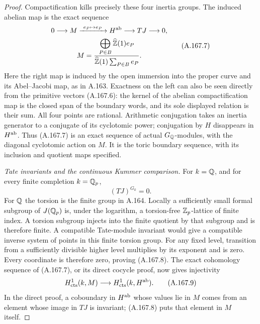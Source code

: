 \begin{proof}
Compactification kills precisely these four inertia groups.  The
induced abelian map is the exact sequence
\[
 \begin{gathered}
 0\longrightarrow M
   \xrightarrow{\ e_P\mapsto e_P\ }H^{\rm ab}
   \longrightarrow TJ\longrightarrow0,\\
 M=\frac{\displaystyle\bigoplus_{P\in B}\widehat{\mathbb Z}(1)e_P}
                 {\widehat{\mathbb Z}(1)\sum_{P\in B}e_P}.
 \end{gathered}
\tag{A.167.7}
\]
Here the right map is induced by the open immersion into the proper
curve and its Abel--Jacobi map, as in A.163.  Exactness on the left
can also be seen directly from the primitive vectors (A.167.6): the
kernel of the abelian compactification map is the closed span of the
boundary words, and its sole displayed relation is their sum.
All four points are rational.  Arithmetic conjugation takes an inertia
generator to a conjugate of its cyclotomic power; conjugation by
\(H\) disappears in \(H^{\rm ab}\).  Thus (A.167.7) is an exact
sequence of actual \(G_\mathbb Q\)-modules, with the diagonal cyclotomic
action on \(M\).  It is the toric boundary sequence, with its
inclusion and quotient maps specified.

\emph{Tate invariants and the continuous Kummer comparison.}
For \(k=\mathbb Q\), and for every finite completion \(k=\mathbb Q_p\),
\[
                              (TJ)^{G_k}=0.
\tag{A.167.8}
\]
For \(\mathbb Q\) the torsion is the finite group in A.164.  Locally a
sufficiently small formal subgroup of \(J(\mathbb Q_p)\) is, under the
logarithm, a torsion-free \(\mathbb Z_p\)-lattice of finite index.  A
torsion subgroup injects into the finite quotient by that subgroup and
is therefore finite.  A compatible Tate-module invariant would give
a compatible inverse system of points in this finite torsion group.
For any fixed level, transition from a sufficiently divisible higher
level multiplies by its exponent and is zero.  Every coordinate is
therefore zero, proving (A.167.8).  The exact cohomology sequence of
(A.167.7), or its direct cocycle proof, now gives injectivity
\[
          H^1_{\rm cts}(k,M)\longrightarrow
                         H^1_{\rm cts}(k,H^{\rm ab}).
\tag{A.167.9}
\]
In the direct proof, a coboundary in \(H^{\rm ab}\) whose values
lie in \(M\) comes from an element whose image in \(TJ\) is
invariant; (A.167.8) puts that element in \(M\) itself.


\end{proof}
